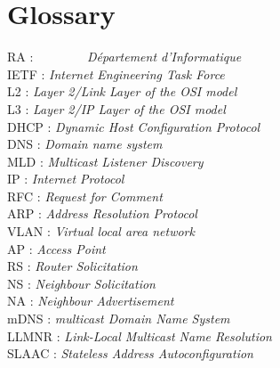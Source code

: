 \documentclass[a4paper,11pt]{article}
\begin{document}
		\section{Glossary}
				\begin{tabbing}
		  		RA : ~~~~~~~~\= \textit{Département d'Informatique} \\
		 	 	IETF : \> \textit{Internet Engineering Task Force} \\
		  		L2 : \> \textit{Layer 2/Link Layer of the OSI model} \\
		  		L3 : \> \textit{Layer 2/IP Layer of the OSI model} \\
		 		DHCP : \> \textit{Dynamic Host Configuration Protocol} \\
		  		DNS : \> \textit{Domain name system} \\
		  		MLD : \> \textit{Multicast Listener Discovery} \\
		  		IP : \> \textit{Internet Protocol} \\
		  		RFC : \> \textit{Request for Comment} \\
		  		ARP : \> \textit{Address Resolution Protocol} \\
		  		VLAN : \> \textit{Virtual local area network} \\
		  		AP : \> \textit{Access Point} \\
		  		RS : \> \textit{Router Solicitation} \\
		  		NS : \> \textit{Neighbour Solicitation} \\
		  		NA : \> \textit{Neighbour Advertisement} \\
		  		mDNS : \> \textit{ multicast Domain Name System} \\
		  		LLMNR : \> \textit{ Link-Local Multicast Name Resolution} \\
		  		SLAAC : \> \textit{ Stateless Address Autoconfiguration} \\
				\end{tabbing}
				
				
				
\end{document}

